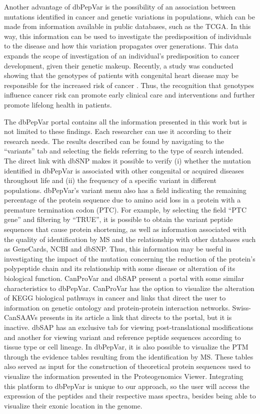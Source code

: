 \documentclass{ieeeaccess}
\begin{document}
Another advantage of dbPepVar is the possibility of an association between mutations identified in cancer and genetic variations in populations, which can be made from information available in public databases, such as the TCGA. In this way, this information can be used to investigate the predisposition of individuals to the disease and how this variation propagates over generations. This data expands the scope of investigation of an individual's predisposition to cancer development, given their genetic makeup. Recently, a study was conducted showing that the genotypes of patients with congenital heart disease may be responsible for the increased risk of cancer \cite{Morton2021-ch}. Thus, the recognition that genotypes influence cancer risk can promote early clinical care and interventions and further promote lifelong health in patients.

The dbPepVar portal contains all the information presented in this work but is not limited to these findings. Each researcher can use it according to their research needs. The results described can be found by navigating to the ``variants'' tab and selecting the fields referring to the type of search intended. The direct link with dbSNP makes it possible to verify (i) whether the mutation identified in dbPepVar is associated with other congenital or acquired diseases throughout life and (ii) the frequency of a specific variant in different populations. dbPepVar's variant menu also has a field indicating the remaining percentage of the protein sequence due to amino acid loss in a protein with a premature termination codon (PTC). For example, by selecting the field ``PTC gene'' and filtering by ``TRUE'', it is possible to obtain the variant peptide sequences that cause protein shortening, as well as information associated with the quality of identification by MS and the relationship with other databases such as GeneCards, NCBI and dbSNP. Thus, this information may be useful in investigating the impact of the mutation concerning the reduction of the protein's polypeptide chain and its relationship with some disease or alteration of its biological function. CanProVar and dbSAP present a portal with some similar characteristics to dbPepVar. CanProVar has the option to visualize the alteration of KEGG biological pathways in cancer and links that direct the user to information on genetic ontology and protein-protein interaction networks. Swiss-CanSAAVs presents in its article a link that directs to the portal, but it is inactive. dbSAP has an exclusive tab for viewing post-translational modifications and another for viewing variant and reference peptide sequences according to tissue type or cell lineage. In dbPepVar, it is also possible to visualize the PTM through the evidence tables resulting from the identification by MS. These tables also served as input for the construction of theoretical protein sequences used to visualize the information presented in the Proteogenomics Viewer. Integrating this platform to dbPepVar is unique to our approach, so the user will access the expression of the peptides and their respective mass spectra, besides being able to visualize their exonic location in the genome.
\end{document}
